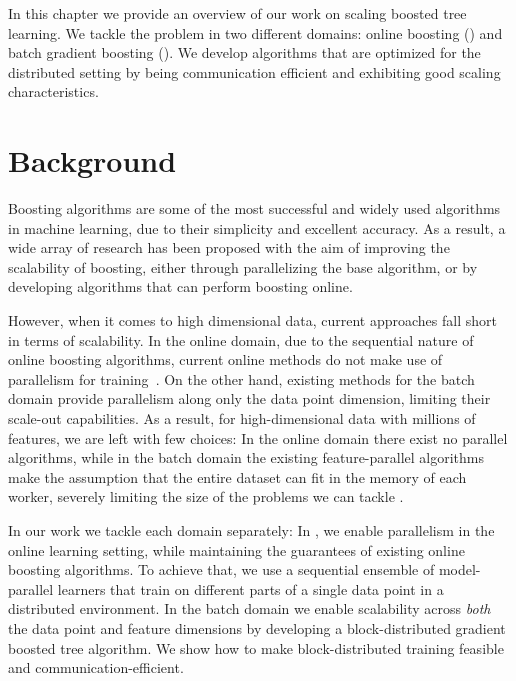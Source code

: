 In this chapter we provide an overview of our work on scaling boosted tree
learning. We tackle the problem in two different domains: online boosting
(\boostvht) and batch gradient boosting (\blockgbt). We develop algorithms
that are optimized for the distributed setting by being communication efficient
and exhibiting good scaling characteristics.

\section{Background}
\label{sec:scalable-boosted-background}

Boosting algorithms are some of the most successful and widely used algorithms
in machine learning, due to their simplicity and excellent accuracy. As a result,
a wide array of research has been proposed with the aim of improving the scalability
of boosting, either through parallelizing the base algorithm, or by developing
algorithms that can perform boosting online.

However, when it comes to high dimensional data, current approaches fall short
in terms of scalability.
In the online domain, due to the sequential nature of online boosting algorithms,
current online methods do not make use of parallelism for training~\cite{online-gradient-boosting, Oza2001online, online-boosting-theoretical}.
On the other hand, existing methods for the batch
domain provide parallelism along only the data point dimension, limiting their
scale-out capabilities. As a result, for high-dimensional data with millions
of features, we are left with few choices: In the online domain there exist
no parallel algorithms, while in the batch domain the existing feature-parallel
algorithms make the assumption that the entire dataset can fit in the memory
of each worker, severely limiting the size of the problems we can tackle
\cite{lightgbm, xgboost}.

In our work we tackle each domain separately:
In \boostvht, we enable parallelism in the online learning setting, while maintaining the guarantees of existing
online boosting algorithms. To achieve that, we use a sequential ensemble of model-parallel learners that train
on different parts of a single data point in a distributed environment.
In the batch domain we enable scalability across \emph{both} the data point and
feature dimensions by developing a block-distributed gradient boosted tree algorithm.
We show how to make block-distributed training feasible and communication-efficient.

